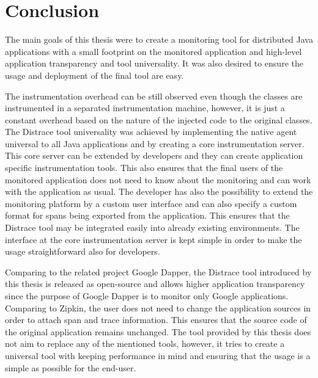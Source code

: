 \chapter{Conclusion}
The main goals of this thesis were to create a monitoring tool for distributed Java applications with a small footprint on the monitored application and high-level application transparency and tool universality. It was also desired to ensure the usage and deployment of the final tool are easy. 

The instrumentation overhead can be still observed even though the classes are instrumented in a separated instrumentation machine, however, it is just a constant overhead based on the nature of the injected code to the original classes. The Distrace tool universality was achieved by implementing the native agent universal to all Java applications and by creating a core instrumentation server. This core server can be extended by developers and they can create application specific instrumentation tools. This also ensures that the final users of the monitored application does not need to know about the monitoring and can work with the application as usual. The developer has also the possibility to extend the monitoring platform by a custom user interface and can also specify a custom format for spans being exported from the application. This ensures that the Distrace tool may be integrated easily into already existing environments. The interface at the core instrumentation server is kept simple in order to make the usage straightforward also for developers.

Comparing to the related project Google Dapper, the Distrace tool introduced by this thesis is released as open-source and allows higher application transparency since the purpose of Google Dapper is to monitor only Google applications. Comparing to Zipkin, the user does not need to change the application sources in order to attach span and trace information. This ensures that the source code of the original application remains unchanged. The tool provided by this thesis does not aim to replace any of the mentioned tools, however, it tries to create a universal tool with keeping performance in mind and ensuring that the usage is a simple as possible for the end-user.


